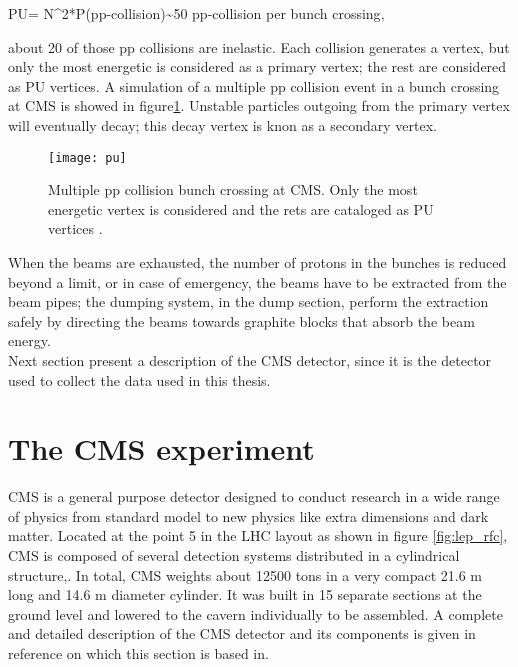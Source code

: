 \beqn
PU= N^2*P(pp-collision)\sim 50  \textrm{  pp-collision per bunch crossing},
\eeqn

\noindent about 20 of those pp collisions are inelastic. Each collision generates a vertex, but only the most energetic is considered as a primary vertex; the rest are considered as PU vertices. A simulation of a multiple pp collision event in a bunch crossing at CMS is showed in figure\ref{fig:pu}. Unstable particles outgoing from the primary vertex will eventually decay; this decay vertex is knon as a secondary vertex.      

\begin{figure}[!h]
\centering
\texttt{[image: pu]}
\caption [Multiple pp collision bunch crossing at CMS.]{Multiple pp collision bunch crossing at CMS. Only the most energetic vertex is considered and the rets are cataloged as PU vertices \cite{}. }\label{fig:pu}
\end{figure}

\noindent When the beams are exhausted, \ie the number of protons in the bunches is reduced beyond a limit, or in case of emergency, the beams have to be extracted from the beam pipes; the dumping system, in the dump section, perform the extraction safely by directing the beams towards graphite blocks that absorb the beam energy.\\

\noindent Next section present a description of the CMS detector, since it is the detector used to collect the data used in this thesis.


\section{The CMS experiment}

\noindent CMS is a general purpose detector designed to conduct research in a wide range of physics from standard model to new physics like extra dimensions and dark matter. Located at the point 5 in the LHC layout as shown in figure \ref{fig:lep_rfc}, CMS is composed of several detection systems distributed in a cylindrical structure,. In total, CMS weights about 12500 tons in a very compact 21.6 m long and 14.6 m diameter cylinder. It was built in 15 separate sections at the ground level and lowered to the cavern individually to be assembled. A complete and detailed description of the CMS detector and its components is given in reference \cite{cms} on which this section is based in.\\

